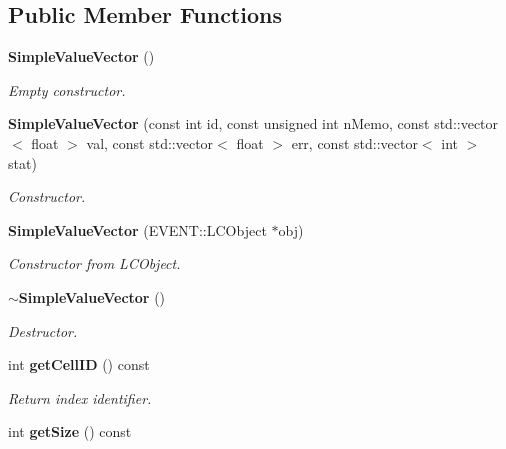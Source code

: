 \subsection*{Public Member Functions}
\begin{DoxyCompactItemize}
\item 
{\bf Simple\-Value\-Vector} ()\label{classCALICE_1_1SimpleValueVector_afa0be915e346466caa53324b6a6ae7a5}

\begin{DoxyCompactList}\small\item\em Empty constructor. \end{DoxyCompactList}\item 
{\bf Simple\-Value\-Vector} (const int id, const unsigned int n\-Memo, const std\-::vector$<$ float $>$ val, const std\-::vector$<$ float $>$ err, const std\-::vector$<$ int $>$ stat)\label{classCALICE_1_1SimpleValueVector_a42768fcda4122561a2ef28daeb184a38}

\begin{DoxyCompactList}\small\item\em Constructor. \end{DoxyCompactList}\item 
{\bf Simple\-Value\-Vector} (E\-V\-E\-N\-T\-::\-L\-C\-Object $\ast$obj)\label{classCALICE_1_1SimpleValueVector_af7c3b2490264f37cb1bc24044d2fb033}

\begin{DoxyCompactList}\small\item\em Constructor from L\-C\-Object. \end{DoxyCompactList}\item 
{\bf $\sim$\-Simple\-Value\-Vector} ()\label{classCALICE_1_1SimpleValueVector_a7f5753e348499618ee9b658608c4cdd6}

\begin{DoxyCompactList}\small\item\em Destructor. \end{DoxyCompactList}\item 
int {\bf get\-Cell\-I\-D} () const \label{classCALICE_1_1SimpleValueVector_adb8b0be370008186ea3e4750edbb1496}

\begin{DoxyCompactList}\small\item\em Return index identifier. \end{DoxyCompactList}\item 
int {\bf get\-Size} () const \label{classCALICE_1_1SimpleValueVector_aa49ebdd8cc44aef01a259cb922bc3b54}


\end{DoxyCompactItemize}
